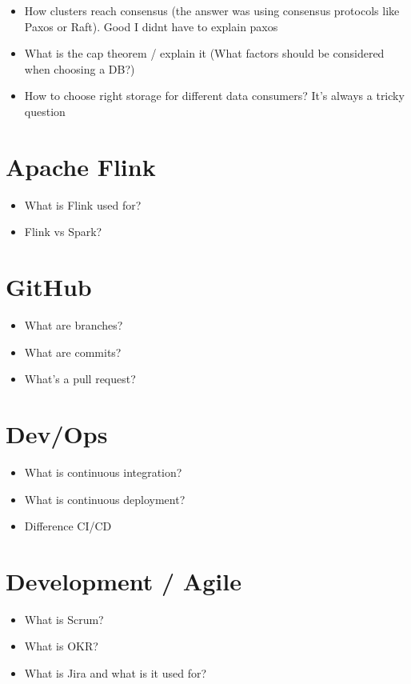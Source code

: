 \documentclass[12pt, numbers=noenddot]{scrreprt} %
\begin{document}
\begin{itemize}
\item How clusters reach consensus (the answer was using consensus protocols like Paxos or Raft). Good I didnt have to explain paxos
\item What is the cap theorem / explain it (What factors should be considered when choosing a DB?)
\item How to choose right storage for different data consumers? It’s always a tricky question
\end{itemize}

\section*{Apache Flink}

\begin{itemize}
\item What is Flink used for?
\item Flink vs Spark?
\end{itemize}

\section*{GitHub}

\begin{itemize}
\item What are branches?
\item What are commits?
\item What's a pull request?
\end{itemize}

\section*{Dev/Ops}

\begin{itemize}
\item What is continuous integration?
\item What is continuous deployment?
\item Difference CI/CD
\end{itemize}

\section*{Development / Agile}

\begin{itemize}
\item What is Scrum?
\item What is OKR?
\item What is Jira and what is it used for?
\end{itemize}
\end{document}
